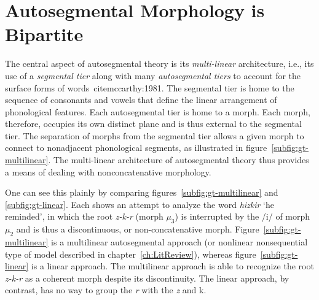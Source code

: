 \section{Autosegmental Morphology is Bipartite}\label{sec:autoseg-bipart}
The central aspect of autosegmental theory 
is its \emph{multi-linear} architecture, i.e., its use of a 
\emph{segmental tier} along with many \emph{autosegmental tiers} to 
account for the surface forms of words\ cite{mccarthy:1981}. The segmental tier is home to the sequence of consonants and vowels that define the linear arrangement of phonological features. Each autosegmental tier is home to a morph. Each morph, therefore, occupies its own distinct plane and is thus external to the segmental tier. The separation of morphs from the segmental tier allows a given morph to connect to nonadjacent phonological segments, as illustrated in figure~\ref{subfig:gt-multilinear}. 
The multi-linear architecture of autosegmental theory thus provides a means of
dealing with nonconcatenative morphology. 

One can see this plainly by comparing figures~\ref{subfig:gt-multilinear} and 
\ref{subfig:gt-linear}. Each shows an attempt to analyze the word \emph{hizkir} `he reminded', 
in which the root \textit{z-k-r} (morph $\mu_3$) is interrupted by the /i/ of morph 
$\mu_2$ and is thus a discontinuous, or non-concatenative morph. 
Figure~\ref{subfig:gt-multilinear} is a multilinear autosegmental approach 
(or nonlinear nonsequential type of model described in chapter~\ref{ch:LitReview}), 
whereas figure~\ref{subfig:gt-linear} is a linear approach. The multilinear approach 
is able to recognize the root \textit{z-k-r} as a coherent morph despite its discontinuity. 
The linear approach, by contrast, has no way to group the \textit{r} with the \textit{z} and {k}.


